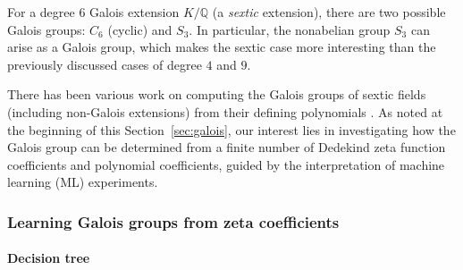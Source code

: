 \documentclass[letterpaper, 10pt]{article}
\newcommand{\1}{\mathds{1}}	%
\theoremstyle{definition}
\theoremstyle{remark}
\begin{document}
For a degree \( 6 \) Galois extension \( K / \mathbb{Q} \) (a \emph{sextic} extension), there are two possible Galois groups: \( C_6 \) (cyclic) and \( S_3 \).  
In particular, the nonabelian group \( S_3 \) can arise as a Galois group, which makes the sextic case more interesting than the previously discussed cases of degree \( 4 \) and \( 9 \).

There has been various work on computing the Galois groups of sextic fields (including non-Galois extensions) from their defining polynomials \cite{cohen2007number,cavallo2019elementary,awtrey2015irreducible}.   
As noted at the beginning of this Section~\ref{sec:galois}, our interest lies in investigating how the Galois group can be determined from a finite number of Dedekind zeta function coefficients and polynomial coefficients, guided by the interpretation of machine learning (ML) experiments.



\subsubsection{Learning Galois groups from zeta coefficients}

\paragraph{Decision tree}
\end{document}
